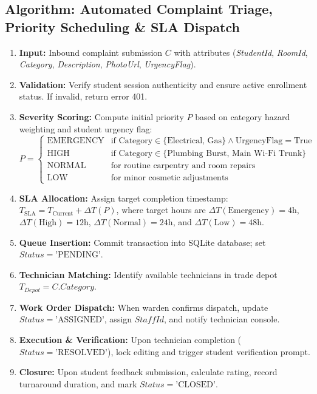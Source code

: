 \documentclass[10pt]{report}
\begin{document}
\subsection{Algorithm: Automated Complaint Triage, Priority Scheduling \& SLA Dispatch}
\begin{enumerate}
\item \textbf{Input:} Inbound complaint submission $C$ with attributes (\textit{StudentId}, \textit{RoomId}, \textit{Category}, \textit{Description}, \textit{PhotoUrl}, \textit{UrgencyFlag}).
\item \textbf{Validation:} Verify student session authenticity and ensure active enrollment status. If invalid, return error 401.
\item \textbf{Severity Scoring:} Compute initial priority $P$ based on category hazard weighting and student urgency flag:
  \[
  P = \begin{cases} 
  \text{EMERGENCY} & \text{if Category} \in \{\text{Electrical, Gas}\} \land \text{UrgencyFlag} = \text{True} \\
  \text{HIGH} & \text{if Category} \in \{\text{Plumbing Burst, Main Wi-Fi Trunk}\} \\
  \text{NORMAL} & \text{for routine carpentry and room repairs} \\
  \text{LOW} & \text{for minor cosmetic adjustments}
  \end{cases}
  \]
\item \textbf{SLA Allocation:} Assign target completion timestamp: $T_{\text{SLA}} = T_{\text{Current}} + \Delta T(P)$, where target hours are $\Delta T(\text{Emergency}) = 4\text{h}$, $\Delta T(\text{High}) = 12\text{h}$, $\Delta T(\text{Normal}) = 24\text{h}$, and $\Delta T(\text{Low}) = 48\text{h}$.
\item \textbf{Queue Insertion:} Commit transaction into SQLite database; set $Status = \text{'PENDING'}$.
\item \textbf{Technician Matching:} Identify available technicians in trade depot $T_{Depot} = C.Category$.
\item \textbf{Work Order Dispatch:} When warden confirms dispatch, update $Status = \text{'ASSIGNED'}$, assign $StaffId$, and notify technician console.
\item \textbf{Execution \& Verification:} Upon technician completion ($Status = \text{'RESOLVED'}$), lock editing and trigger student verification prompt.
\item \textbf{Closure:} Upon student feedback submission, calculate rating, record turnaround duration, and mark $Status = \text{'CLOSED'}$.
\end{enumerate}
\end{document}
